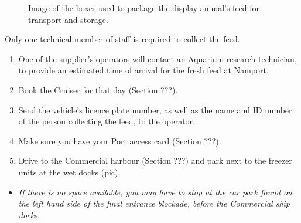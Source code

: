 \documentclass[
  letterpaper,
  DIV=11,
  numbers=noendperiod]{scrreprt}
\providecommand{\tightlist}{%
  \setlength{\itemsep}{0pt}\setlength{\parskip}{0pt}}\usepackage{longtable,booktabs,array}
\begin{document}
\begin{figure}[H]

\begin{minipage}[t]{0.50\linewidth}

{\centering 


}

\end{minipage}%
%
\begin{minipage}[t]{0.50\linewidth}

{\centering 


}

\end{minipage}%

\caption{\label{fig-feed-boxes}Image of the boxes used to package the
display animal's feed for transport and storage.}

\end{figure}

{Only one technical member of staff is required to collect the feed}.

\begin{enumerate}
\def\labelenumi{\arabic{enumi}.}
\tightlist
\item
  One of the supplier's operators will contact an Aquarium research
  technician, to provide an estimated time of arrival for the fresh feed
  at Namport.
\item
  Book the Cruiser for that day (Section ???).
\item
  Send the vehicle's licence plate number, as well as the name and ID
  number of the person collecting the feed, to the operator.
\item
  Make sure you have your Port access card (Section ???).
\item
  Drive to the Commercial harbour (Section ???) and park next to the
  freezer units at the wet docks (pic).
\end{enumerate}

\begin{itemize}
\tightlist
\item
  \emph{If there is no space available, you may have to stop at the car
  park found on the left hand side of the final entrance blockade,
  before the Commercial ship docks}.
\end{itemize}
\end{document}
